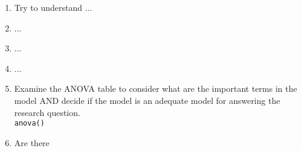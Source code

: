 \documentclass[a4paper, 11pt, twoside]{article}
\begin{document}
\begin{enumerate}
	\item Try to understand ...
	\item ...
	\item ...
	\item ...
	\item Examine the ANOVA table to consider what are the important terms in the model AND decide if the model is an adequate model for answering the research question.\\
	\texttt{anova()}
	\item Are there 
\end{enumerate}
\end{document}
